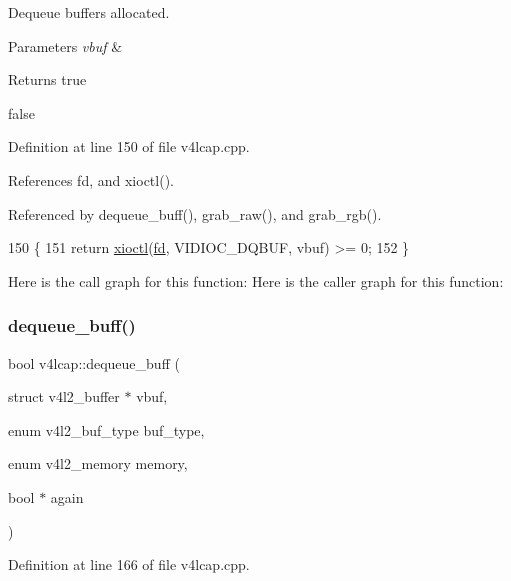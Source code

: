 Dequeue buffers allocated. 


\begin{DoxyParams}{Parameters}
{\em vbuf} & \\
\hline
\end{DoxyParams}
\begin{DoxyReturn}{Returns}
true 

false 
\end{DoxyReturn}


Definition at line 150 of file v4lcap.\+cpp.



References fd, and xioctl().



Referenced by dequeue\+\_\+buff(), grab\+\_\+raw(), and grab\+\_\+rgb().


\begin{DoxyCode}
150                                                    \{
151     \textcolor{keywordflow}{return} \hyperlink{classv4lcap_ab5aaa5a8c0df17f5ca57e0b5170232cb}{xioctl}(\hyperlink{classv4lcap_a38109593bde997dad13b3a461569573d}{fd}, VIDIOC\_DQBUF, vbuf) >= 0;
152 \}
\end{DoxyCode}
Here is the call graph for this function\+:
Here is the caller graph for this function\+:
\mbox{\label{classv4lcap_aeb01cf9f6ded716a28f23e0be13d7ca5}} 
\subsubsection{\texorpdfstring{dequeue\+\_\+buff()}{dequeue\_buff()}\hspace{0.1cm}{\footnotesize\ttfamily [2/3]}}
{\footnotesize\ttfamily bool v4lcap\+::dequeue\+\_\+buff (\begin{DoxyParamCaption}\item[{struct v4l2\+\_\+buffer $\ast$}]{vbuf,  }\item[{enum v4l2\+\_\+buf\+\_\+type}]{buf\+\_\+type,  }\item[{enum v4l2\+\_\+memory}]{memory,  }\item[{bool $\ast$}]{again }\end{DoxyParamCaption})}



Definition at line 166 of file v4lcap.\+cpp.



